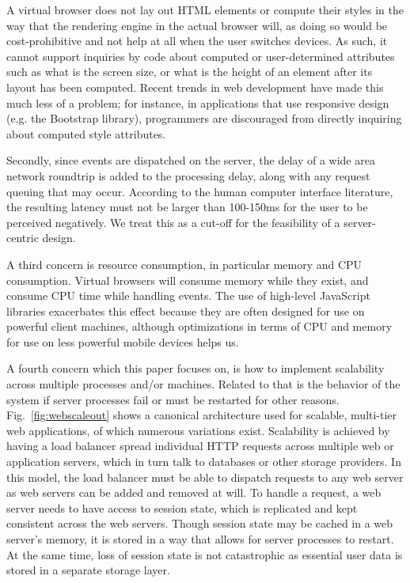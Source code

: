 A virtual browser does not lay out HTML elements or compute their styles in the
way that the rendering engine in the actual browser will, as doing so would be 
cost-prohibitive and not help at all when the user switches devices.  As such,
it cannot support inquiries by code about computed or user-determined
attributes such as what is the screen size, or what is the height of an
element after its layout has been computed.  Recent trends in web development
have made this much less of a problem; for instance, in applications
that use responsive design (e.g. the Bootstrap library),
programmers are discouraged from directly inquiring about computed style
attributes.

Secondly, since events are dispatched on the server,
the delay of a wide area network roundtrip is added to the processing delay,
along with any request queuing that may occur.  According to the human computer
interface literature, the resulting latency must not be larger than 100-150ms 
for the user to be perceived negatively. We treat this as a cut-off for the
feasibility of a server-centric design.

A third concern is resource consumption, in particular memory and CPU consumption.
Virtual browsers will consume memory while they exist, and consume CPU time
while handling events. The use of high-level JavaScript libraries exacerbates
this effect because they are often designed for use on powerful client machines,
although optimizations in terms of CPU and memory for use on less powerful
mobile devices helps us.

A fourth concern which this paper focuses on, is how to implement
scalability across multiple processes and/or machines. Related to that is the 
behavior of the system if server processes fail or must be restarted for other reasons.
Fig.~\ref{fig:webscaleout} shows a canonical architecture used for scalable, multi-tier web 
applications, of which numerous variations exist.  Scalability is achieved
by having a load balancer spread individual HTTP requests across multiple
web or application servers, which in turn talk to databases or other storage
providers.  In this model, the load balancer must be able to dispatch requests 
to any web server as web servers can be added and removed at will. To handle a 
request, a web server needs to have access to session state, which is replicated
and kept consistent across the web servers.  Though session state may be cached
in a web server's memory, it is stored in a way that allows for server processes
to restart.  At the same time, loss of session state is not catastrophic
as essential user data is stored in a separate storage layer.

